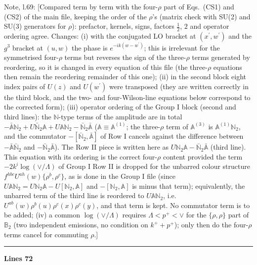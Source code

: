\documentclass[10pt]{article}
\newenvironment{notebox}{\def\FrameCommand{{\color{notebar}\vrule width 1.5pt}\hspace{6pt}}\MakeFramed{\advance\hsize-\width\FrameRestore}\small}{\endMakeFramed}
\def\mf#1{\mathbb{#1}}
\begin{document}
\begin{notebox}\textsf{\small Note, l.69:} [Compared term by term with the four-$\rho$ part of Eqs.~(CS1) and (CS2) of the main file, keeping the order of the $\rho$'s (matrix check with SU(2) and SU(3) generators for $\rho$): prefactor, kernels, signs, factors $\frac12$, $2$ and operator ordering agree. Changes: (i) with the conjugated LO bracket at $(x^{\prime},w^{\prime})$ and the $g^{3}$ bracket at $(u,w)$ the phase is $e^{-ik(w-w^{\prime})}$; this is irrelevant for the symmetrised four-$\rho$ terms but reverses the sign of the three-$\rho$ terms generated by reordering, so it is changed in every equation of this file (the three-$\rho$ equations then remain the reordering remainder of this one); (ii) in the second block eight index pairs of $U(z)$ and $U(w^{\prime})$ were transposed (they are written correctly in the third block, and the two- and four-Wilson-line equations below correspond to the corrected form); (iii) operator ordering of the Group I block (second and third lines): the $\mf{N}$-type terms of the amplitude are in total $-\bar{\mf{A}}\mf{N}_{2}+U\bar{\mf{N}}_{2}\mf{A}+U\mf{A}\mf{N}_{2}-\bar{\mf{N}}_{2}\bar{\mf{A}}$ ($\mf{A}\equiv\mf{A}^{(1)}$; the three-$\rho$ term of $\mf{A}^{(3)}$ is $\mf{A}^{(1)}\mf{N}_{2}$, and the commutator $-[\bar{\mf{N}}_{2},\bar{\mf{A}}]$ of Row I cancels against the difference between $-\bar{\mf{A}}\bar{\mf{N}}_{2}$ and $-\bar{\mf{N}}_{2}\bar{\mf{A}}$). The Row II piece is written here as $U\mf{N}_{2}\mf{A}-\bar{\mf{N}}_{2}\bar{\mf{A}}$ (third line). This equation with its ordering is the correct four-$\rho$ content provided the term $-2k^{i}\log(\vee/\Lambda)$ of Group I Row II is dropped for the unbarred colour structure $f^{hbc}U^{ah}(w)\{\rho^{b},\rho^{c}\}$, as is done in the Group I file (since $U\mf{A}\mf{N}_{2}=U\mf{N}_{2}\mf{A}-U[\mf{N}_{2},\mf{A}]$ and $-[\mf{N}_{2},\mf{A}]$ is minus that term); equivalently, the unbarred term of the third line is reordered to $U\mf{A}\mf{N}_{2}$, i.e. $U^{ab}(w)\rho^{b}(u)\rho^{c}(x)\rho^{c}(y)$, and that term is kept. No commutator term is to be added; (iv) a common $\log(\vee/\Lambda)$ requires $\Lambda<p^{+}<\vee$ for the $\{\rho,\rho\}$ part of $\mf{B}_{2}$ (two independent emissions, no condition on $k^{+}+p^{+}$); only then do the four-$\rho$ terms cancel for commuting $\rho$.]\end{notebox}
\noindent\rule{\linewidth}{0.3pt}\par\noindent\textbf{Lines 72} \par
\end{document}
